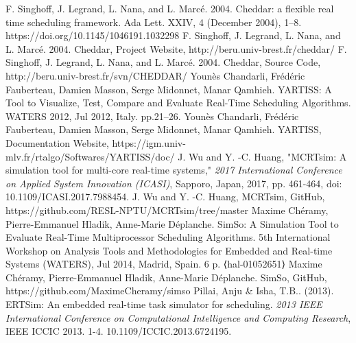 \documentclass[conference,compsoc]{IEEEtran}
\begin{document}
%
%
%
\newpage
\begin{thebibliography}{1}
F. Singhoff, J. Legrand, L. Nana, and L. Marcé. 2004. Cheddar: a flexible real time scheduling framework. Ada Lett. XXIV, 4 (December 2004), 1–8. https://doi.org/10.1145/1046191.1032298
F. Singhoff, J. Legrand, L. Nana, and L. Marcé. 2004. Cheddar, Project Website,
http://beru.univ-brest.fr/cheddar/
F. Singhoff, J. Legrand, L. Nana, and L. Marcé. 2004. Cheddar, Source Code,
http://beru.univ-brest.fr/svn/CHEDDAR/
Younès Chandarli, Frédéric Fauberteau, Damien Masson, Serge Midonnet, Manar Qamhieh. YARTISS: A Tool to Visualize, Test, Compare and Evaluate Real-Time Scheduling Algorithms. WATERS 2012, Jul 2012, Italy. pp.21--26.
Younès Chandarli, Frédéric Fauberteau, Damien Masson, Serge Midonnet, Manar Qamhieh. YARTISS, Documentation Website, https://igm.univ-mlv.fr/rtalgo/Softwares/YARTISS/doc/
J. Wu and Y. -C. Huang, "MCRTsim: A simulation tool for multi-core real-time systems," \emph{2017 International Conference on Applied System Innovation (ICASI)}, Sapporo, Japan, 2017, pp. 461-464, doi: 10.1109/ICASI.2017.7988454.
J. Wu and Y. -C. Huang, MCRTsim, GitHub, https://github.com/RESL-NPTU/MCRTsim/tree/master
Maxime Chéramy, Pierre-Emmanuel Hladik, Anne-Marie Déplanche. SimSo: A Simulation Tool to Evaluate Real-Time Multiprocessor Scheduling Algorithms. 5th International Workshop on Analysis Tools and Methodologies for Embedded and Real-time Systems (WATERS), Jul 2014, Madrid, Spain. 6 p. ⟨hal-01052651⟩
Maxime Chéramy, Pierre-Emmanuel Hladik, Anne-Marie Déplanche. SimSo, GitHub, https://github.com/MaximeCheramy/simso
Pillai, Anju \& Isha, T.B.. (2013). ERTSim: An embedded real-time task simulator for scheduling. \emph{2013 IEEE International Conference on Computational Intelligence and Computing Research}, IEEE ICCIC 2013. 1-4. 10.1109/ICCIC.2013.6724195. 

\end{thebibliography}
\end{document}
